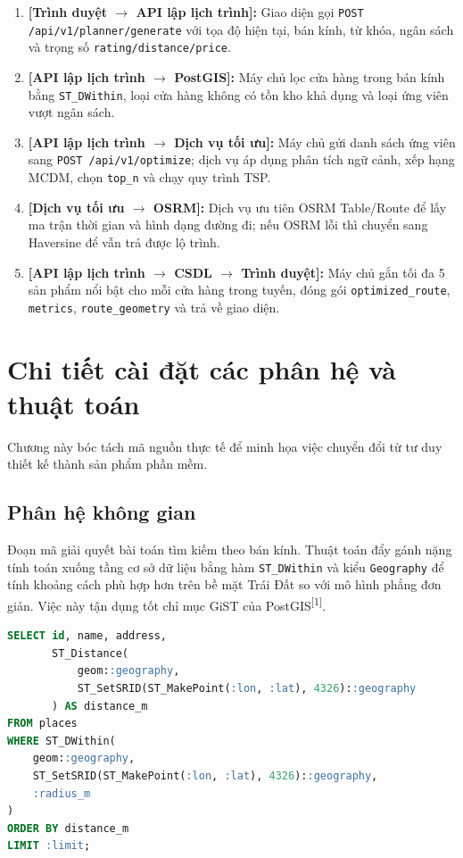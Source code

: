 \documentclass[12pt, a4paper]{article}
\begin{document}
\begin{enumerate}
    \item \textbf{[Trình duyệt $\rightarrow$ API lập lịch trình]:} Giao diện gọi \texttt{POST /api/v1/planner/generate} với tọa độ hiện tại, bán kính, từ khóa, ngân sách và trọng số \texttt{rating/distance/price}.
    \item \textbf{[API lập lịch trình $\rightarrow$ PostGIS]:} Máy chủ lọc cửa hàng trong bán kính bằng \texttt{ST\_DWithin}, loại cửa hàng không có tồn kho khả dụng và loại ứng viên vượt ngân sách.
    \item \textbf{[API lập lịch trình $\rightarrow$ Dịch vụ tối ưu]:} Máy chủ gửi danh sách ứng viên sang \texttt{POST /api/v1/optimize}; dịch vụ áp dụng phân tích ngữ cảnh, xếp hạng MCDM, chọn \texttt{top\_n} và chạy quy trình TSP.
    \item \textbf{[Dịch vụ tối ưu $\rightarrow$ OSRM]:} Dịch vụ ưu tiên OSRM Table/Route để lấy ma trận thời gian và hình dạng đường đi; nếu OSRM lỗi thì chuyển sang Haversine để vẫn trả được lộ trình.
    \item \textbf{[API lập lịch trình $\rightarrow$ CSDL $\rightarrow$ Trình duyệt]:} Máy chủ gắn tối đa 5 sản phẩm nổi bật cho mỗi cửa hàng trong tuyến, đóng gói \texttt{optimized\_route}, \texttt{metrics}, \texttt{route\_geometry} và trả về giao diện.
\end{enumerate}

\clearpage
\section{Chi tiết cài đặt các phân hệ và thuật toán}
Chương này bóc tách mã nguồn thực tế để minh họa việc chuyển đổi từ tư duy thiết kế thành sản phẩm phần mềm.

\subsection{Phân hệ không gian}
Đoạn mã giải quyết bài toán tìm kiếm theo bán kính. Thuật toán đẩy gánh nặng tính toán xuống tầng cơ sở dữ liệu bằng hàm \texttt{ST\_DWithin} và kiểu \texttt{Geography} để tính khoảng cách phù hợp hơn trên bề mặt Trái Đất so với mô hình phẳng đơn giản. Việc này tận dụng tốt chỉ mục GiST của PostGIS\textsuperscript{[1]}.

\begin{lstlisting}[language=SQL, caption={Truy vấn không gian theo bán kính}]
SELECT id, name, address,
       ST_Distance(
           geom::geography,
           ST_SetSRID(ST_MakePoint(:lon, :lat), 4326)::geography
       ) AS distance_m
FROM places
WHERE ST_DWithin(
    geom::geography,
    ST_SetSRID(ST_MakePoint(:lon, :lat), 4326)::geography,
    :radius_m
)
ORDER BY distance_m
LIMIT :limit;
\end{lstlisting}
\end{document}
